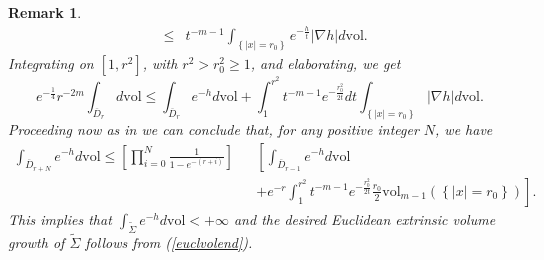 \documentclass[11pt,leqno]{amsart}\usepackage{amsmath}
\newtheorem{remark}[theorem]{Remark}
\numberwithin{equation}{section}
\begin{document}
\begin{remark}
{\begin{eqnarray*}
&\leq& t^{-m-1}\int_{\left\{|x|=r_0\right\}}e^{-\frac{h}{t}}|\nabla h|d\mathrm{vol}.
\end{eqnarray*}
Integrating on $[1,r^2]$, with $r^2>r_0^2\geq1$, and elaborating, we get
\begin{equation}\label{euclvolend}
e^{-\frac{1}{4}}r^{-2m}\int_{\overline{D}_r} d\mathrm{vol}\leq \int_{\overline{D}_r}e^{-h}d\mathrm{vol}+\int_{1}^{r^2}t^{-m-1}e^{-\frac{r_0^2}{2t}}dt\int_{\left\{|x|=r_0\right\}}|\nabla h|d\mathrm{vol}.
\end{equation}
Proceeding now as in \cite{ChZh-volume} we can conclude that, for any positive integer $N$, we have
\begin{eqnarray*}
\int_{\overline{D}_{r+N}}e^{-h}d\mathrm{vol}\leq \left[\prod_{i=0}^{N}\frac{1}{1-e^{-(r+i)}}\right]&&\left[\int_{\overline{D}_{r-1}}e^{-h}d\mathrm{vol}\right.\\&&\left.+e^{-r}\int_{1}^{r^2}t^{-m-1}e^{-\frac{r_0^2}{2t}}\frac{r_0}{2}\mathrm{vol}_{m-1}\left(\left\{|x|=r_0\right\}\right)\right].
\end{eqnarray*}
This implies that $\int_{\tilde{\Sigma}}e^{-h}d\mathrm{vol}<+\infty$ and the desired Euclidean extrinsic volume growth of $\tilde{\Sigma}$ follows from (\ref{euclvolend}).
}
\end{remark}
\end{document}
